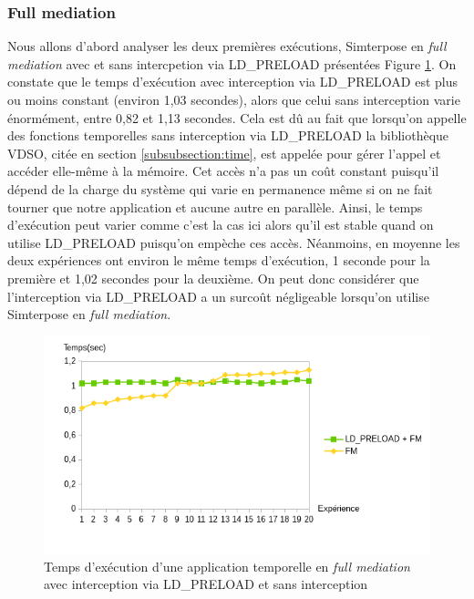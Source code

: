 \subsubsection{Full mediation}
Nous allons d'abord analyser les deux premières exécutions, Simterpose en \textit{full mediation} avec et sans intercpetion via LD\_PRELOAD présentées Figure \ref{Temps_FM}. On constate que le temps d'exécution avec interception via LD\_PRELOAD est plus ou moins constant (environ 1,03 secondes), alors que celui sans interception varie énormément, entre 0,82 et 1,13 secondes. Cela est dû au fait que lorsqu'on appelle des fonctions temporelles sans interception via LD\_PRELOAD la bibliothèque VDSO, citée en section \ref{subsubsection:time}, est appelée pour gérer l'appel et accéder elle-même à la mémoire. Cet accès n'a pas un coût constant puisqu'il dépend de la charge du système qui varie en permanence même si on ne fait tourner que notre application et aucune autre en parallèle. Ainsi, le temps d'exécution peut varier comme c'est la cas ici alors qu'il est stable quand on utilise LD\_PRELOAD puisqu'on empèche ces accès. Néanmoins, en moyenne les deux expériences ont environ le même temps d'exécution, 1 seconde pour la première et 1,02 secondes pour la deuxième. On peut donc considérer que l'interception via LD\_PRELOAD a un surcoût négligeable lorsqu'on utilise Simterpose en \textit{full mediation}.

\begin{figure}
  \centering
    \includegraphics[scale=0.80]{mesures/graph/Temps_FM.png}
    \caption{Temps d'exécution d'une application temporelle en \textit{full mediation} avec interception via LD\_PRELOAD et sans interception}
    \label{Temps_FM}
\end{figure}

